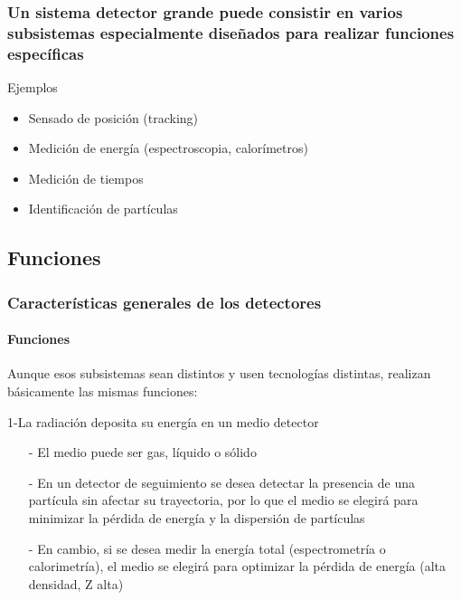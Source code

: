 \documentclass{beamer}
\begin{document}
\begin{frame}
\frametitle{Un sistema detector grande puede consistir en varios
subsistemas especialmente diseñados para realizar funciones específicas}
\begin{exampleblock}{Ejemplos}
\begin{itemize}
\item Sensado de posición (tracking)
\item Medición de energía (espectroscopia, calorímetros)
\item Medición de tiempos
\item Identificación de partículas
\end{itemize}
\end{exampleblock}
\end{frame} 

\subsection{Funciones}

\begin{frame}
\frametitle{Características generales de los detectores}
\framesubtitle{{\color{blue}Funciones}}
\begin{exampleblock}{}
Aunque esos subsistemas sean distintos y usen tecnologías
distintas, realizan básicamente las mismas funciones:
\end{exampleblock}
\begin{block}{1-La radiación deposita su energía en un medio detector}
\begin{itemize}
\item[-] El medio puede ser {\color[rgb]{0.82,0.1,0.26}gas, líquido o sólido}

\item[-] En un detector de seguimiento se desea detectar la presencia de una partícula
sin afectar su trayectoria, por lo que \alert{el medio se elegirá para minimizar la
pérdida de energía y la dispersión de partículas}

\item[-]En cambio, si se desea medir la energía total (espectrometría o calorimetría),
el medio se elegirá para optimizar la pérdida de energía (alta densidad, Z alta)
\end{itemize}
\end{block}
\end{frame} 
\end{document}
